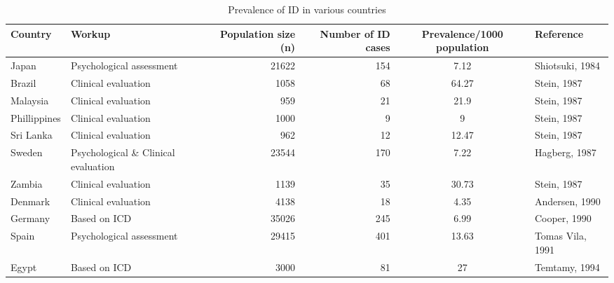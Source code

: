 \begin{spacing}{0.65}
\begin{longtable}{l p{1in} r r S l}
\caption{Prevalence of ID in various countries}
\label{tab:my_label}
	Country          & Workup                               & Population size (n) & Number of ID cases & Prevalence/1000 population & Reference          \\* \midrule
	Japan            & Psychological assessment             & 21622               & 154                & 7.12                       & Shiotsuki, 1984    \\* \midrule
	Brazil           & Clinical evaluation                  & 1058                & 68                 & 64.27                      & Stein, 1987        \\* \midrule
	Malaysia         & Clinical evaluation                  & 959                 & 21                 & 21.9                       & Stein, 1987        \\* \midrule
	Phillippines     & Clinical evaluation                  & 1000                & 9                  & 9                          & Stein, 1987        \\* \midrule
	Sri Lanka        & Clinical evaluation                  & 962                 & 12                 & 12.47                      & Stein, 1987        \\* \midrule
	Sweden           & Psychological \& Clinical evaluation & 23544               & 170                & 7.22                       & Hagberg, 1987      \\* \midrule
	Zambia           & Clinical evaluation                  & 1139                & 35                 & 30.73                      & Stein, 1987        \\* \midrule
	Denmark          & Clinical evaluation                  & 4138                & 18                 & 4.35                       & Andersen, 1990     \\* \midrule
	Germany          & Based on ICD                         & 35026               & 245                & 6.99                       & Cooper, 1990       \\* \midrule
	Spain            & Psychological assessment             & 29415               & 401                & 13.63                      & Tomas Vila, 1991   \\* \midrule
	Egypt            & Based on ICD                         & 3000                & 81                 & 27                         & Temtamy, 1994      \\* \midrule

\end{longtable}
\end{spacing}
